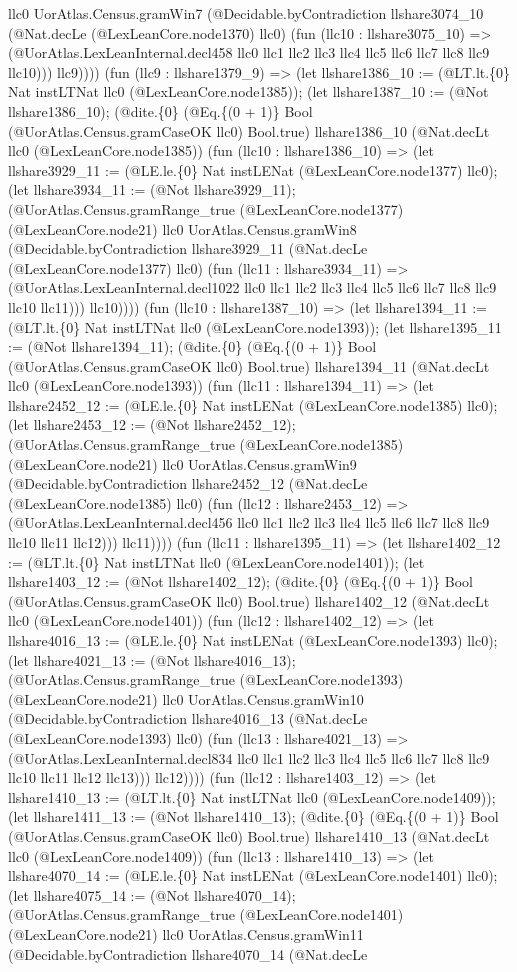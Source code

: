 \documentclass[11pt]{article}
\begin{document}
llc0 UorAtlas.Census.gramWin7 (@Decidable.byContradiction llshare3074\_10 (@Nat.decLe (@LexLeanCore.node1370) llc0) (fun (llc10 : llshare3075\_10) => (@UorAtlas.LexLeanInternal.decl458 llc0 llc1 llc2 llc3 llc4 llc5 llc6 llc7 llc8 llc9 llc10))) llc9)))) (fun (llc9 : llshare1379\_9) => (let llshare1386\_10 := (@LT.lt.\{0\} Nat instLTNat llc0 (@LexLeanCore.node1385)); (let llshare1387\_10 := (@Not llshare1386\_10); (@dite.\{0\} (@Eq.\{(0 + 1)\} Bool (@UorAtlas.Census.gramCaseOK llc0) Bool.true) llshare1386\_10 (@Nat.decLt llc0 (@LexLeanCore.node1385)) (fun (llc10 : llshare1386\_10) => (let llshare3929\_11 := (@LE.le.\{0\} Nat instLENat (@LexLeanCore.node1377) llc0); (let llshare3934\_11 := (@Not llshare3929\_11); (@UorAtlas.Census.gramRange\_true (@LexLeanCore.node1377) (@LexLeanCore.node21) llc0 UorAtlas.Census.gramWin8 (@Decidable.byContradiction llshare3929\_11 (@Nat.decLe (@LexLeanCore.node1377) llc0) (fun (llc11 : llshare3934\_11) => (@UorAtlas.LexLeanInternal.decl1022 llc0 llc1 llc2 llc3 llc4 llc5 llc6 llc7 llc8 llc9 llc10 llc11))) llc10)))) (fun (llc10 : llshare1387\_10) => (let llshare1394\_11 := (@LT.lt.\{0\} Nat instLTNat llc0 (@LexLeanCore.node1393)); (let llshare1395\_11 := (@Not llshare1394\_11); (@dite.\{0\} (@Eq.\{(0 + 1)\} Bool (@UorAtlas.Census.gramCaseOK llc0) Bool.true) llshare1394\_11 (@Nat.decLt llc0 (@LexLeanCore.node1393)) (fun (llc11 : llshare1394\_11) => (let llshare2452\_12 := (@LE.le.\{0\} Nat instLENat (@LexLeanCore.node1385) llc0); (let llshare2453\_12 := (@Not llshare2452\_12); (@UorAtlas.Census.gramRange\_true (@LexLeanCore.node1385) (@LexLeanCore.node21) llc0 UorAtlas.Census.gramWin9 (@Decidable.byContradiction llshare2452\_12 (@Nat.decLe (@LexLeanCore.node1385) llc0) (fun (llc12 : llshare2453\_12) => (@UorAtlas.LexLeanInternal.decl456 llc0 llc1 llc2 llc3 llc4 llc5 llc6 llc7 llc8 llc9 llc10 llc11 llc12))) llc11)))) (fun (llc11 : llshare1395\_11) => (let llshare1402\_12 := (@LT.lt.\{0\} Nat instLTNat llc0 (@LexLeanCore.node1401)); (let llshare1403\_12 := (@Not llshare1402\_12); (@dite.\{0\} (@Eq.\{(0 + 1)\} Bool (@UorAtlas.Census.gramCaseOK llc0) Bool.true) llshare1402\_12 (@Nat.decLt llc0 (@LexLeanCore.node1401)) (fun (llc12 : llshare1402\_12) => (let llshare4016\_13 := (@LE.le.\{0\} Nat instLENat (@LexLeanCore.node1393) llc0); (let llshare4021\_13 := (@Not llshare4016\_13); (@UorAtlas.Census.gramRange\_true (@LexLeanCore.node1393) (@LexLeanCore.node21) llc0 UorAtlas.Census.gramWin10 (@Decidable.byContradiction llshare4016\_13 (@Nat.decLe (@LexLeanCore.node1393) llc0) (fun (llc13 : llshare4021\_13) => (@UorAtlas.LexLeanInternal.decl834 llc0 llc1 llc2 llc3 llc4 llc5 llc6 llc7 llc8 llc9 llc10 llc11 llc12 llc13))) llc12)))) (fun (llc12 : llshare1403\_12) => (let llshare1410\_13 := (@LT.lt.\{0\} Nat instLTNat llc0 (@LexLeanCore.node1409)); (let llshare1411\_13 := (@Not llshare1410\_13); (@dite.\{0\} (@Eq.\{(0 + 1)\} Bool (@UorAtlas.Census.gramCaseOK llc0) Bool.true) llshare1410\_13 (@Nat.decLt llc0 (@LexLeanCore.node1409)) (fun (llc13 : llshare1410\_13) => (let llshare4070\_14 := (@LE.le.\{0\} Nat instLENat (@LexLeanCore.node1401) llc0); (let llshare4075\_14 := (@Not llshare4070\_14); (@UorAtlas.Census.gramRange\_true (@LexLeanCore.node1401) (@LexLeanCore.node21) llc0 UorAtlas.Census.gramWin11 (@Decidable.byContradiction llshare4070\_14 (@Nat.decLe 
\end{document}
